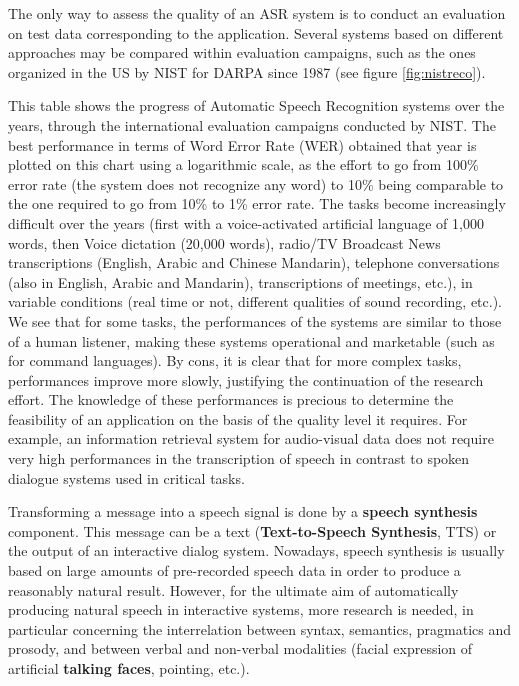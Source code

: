 \begin{multicols}{2}
The only way to assess the quality of an ASR system is to conduct an
evaluation on test data corresponding to the application. Several
systems based on different approaches may be compared within
evaluation campaigns, such as the ones organized in the US by NIST for
DARPA since 1987 (see figure \ref{fig:nistreco}).  

This table shows the progress of Automatic Speech Recognition systems
over the years, through the international evaluation campaigns
conducted by NIST.  The best performance in terms of Word Error Rate
(WER) obtained that year is plotted on this chart using a logarithmic
scale, as the effort to go from 100\% error rate (the system does not
recognize any word) to 10\% being comparable to the one required to go
from 10\% to 1\% error rate. The tasks become increasingly difficult
over the years (first with a voice-activated artificial language of
1,000 words, then Voice dictation (20,000 words), radio/TV Broadcast
News transcriptions (English, Arabic and Chinese Mandarin), telephone
conversations (also in English, Arabic and Mandarin), transcriptions
of meetings, etc.), in variable conditions (real time or not,
different qualities of sound recording, etc.). We see that for some
tasks, the performances of the systems are similar to those of a human
listener, making these systems operational and marketable (such as for
command languages). By cons, it is clear that for more complex tasks,
performances improve more slowly, justifying the continuation of the
research effort. The knowledge of these performances is precious to
determine the feasibility of an application on the basis of the
quality level it requires. For example, an information retrieval
system for audio-visual data does not require very high performances
in the transcription of speech in contrast to spoken dialogue systems
used in critical tasks.

Transforming a message into a speech signal is done by a {\bf speech
synthesis} component. This message can be a text ({\bf Text-to-Speech
Synthesis}, TTS) or the output of an interactive dialog system. Nowadays,
speech synthesis is usually based on large amounts of pre-recorded
speech data in order to produce a reasonably natural result. However,
for the ultimate aim of automatically producing natural speech in
interactive systems, more research is needed, in particular concerning
the interrelation between syntax, semantics, pragmatics and prosody,
and between verbal and non-verbal modalities (facial expression of
artificial {\bf talking faces}, pointing, etc.).


\end{multicols}
